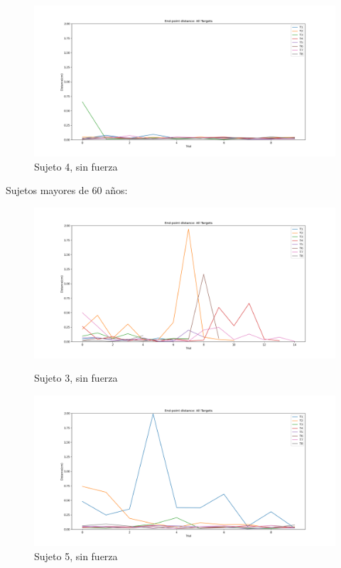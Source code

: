 \documentclass[a4paper,11pt, oneside]{book}
\begin{document}
\begin{figure}[h]
	\begin{minipage}[b]{0.5\linewidth}
		\centering
		\includegraphics[width=\linewidth]{sujeto4/no_force/evolution_distance}
		\caption{Sujeto 4, sin fuerza}
		\label{fig:figura1}
	\end{minipage}
\end{figure}


Sujetos mayores de 60 años:
\\
\begin{figure}[h]
	\begin{minipage}[b]{0.5\linewidth}
		\centering
		\includegraphics[width=\linewidth]{sujeto3/no_force/evolution_distance}
		\caption{Sujeto 3, sin fuerza}
		\label{fig:figura1}
	\end{minipage}
	\hspace{0.5cm}
	\begin{minipage}[b]{0.5\linewidth}
		\centering
		\includegraphics[width=\linewidth]{sujeto5/no_force/evolution_distance}
		\caption{Sujeto 5, sin fuerza}
		\label{fig:figura2}
	\end{minipage}
\end{figure}
\end{document}
